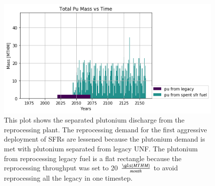 \begin{figure}[htbp!]
	\begin{center}
		\includegraphics[scale=0.7]{./images/french-transition/pu.png}
	\end{center}
	\caption{This plot shows the separated plutonium discharge from the reprocessing plant.
			 The reprocessing demand for the first aggressive deployment of \glspl{SFR}
			 are lessened because the plutonium demand is met with plutonium separated from legacy \gls{UNF}.
			 The plutonium from reprocessing legacy fuel is a flat rectangle because the 
			 reprocessing throughput was set to 20 $\frac{\gls{MTHM}}{month}$ to avoid reprocessing
			 all the legacy in one timestep. }
	\label{fig:pu_no_cum}
\end{figure}

